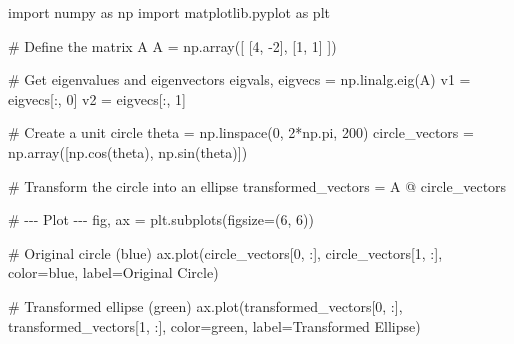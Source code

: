 \documentclass[
  letterpaper,
  DIV=11,
  numbers=noendperiod]{scrreprt}
\newenvironment{Shaded}{\begin{snugshade}}{\end{snugshade}}
\newcommand{\CommentTok}[1]{\textcolor[rgb]{0.37,0.37,0.37}{#1}}
\newcommand{\DecValTok}[1]{\textcolor[rgb]{0.68,0.00,0.00}{#1}}
\newcommand{\ImportTok}[1]{\textcolor[rgb]{0.00,0.46,0.62}{#1}}
\newcommand{\NormalTok}[1]{\textcolor[rgb]{0.00,0.23,0.31}{#1}}
\newcommand{\OperatorTok}[1]{\textcolor[rgb]{0.37,0.37,0.37}{#1}}
\newcommand{\StringTok}[1]{\textcolor[rgb]{0.13,0.47,0.30}{#1}}
\begin{document}
\begin{Shaded}
\begin{Highlighting}[]
\ImportTok{import}\NormalTok{ numpy }\ImportTok{as}\NormalTok{ np}
\ImportTok{import}\NormalTok{ matplotlib.pyplot }\ImportTok{as}\NormalTok{ plt}

\CommentTok{\# Define the matrix A}
\NormalTok{A }\OperatorTok{=}\NormalTok{ np.array([}
\NormalTok{    [}\DecValTok{4}\NormalTok{, }\OperatorTok{{-}}\DecValTok{2}\NormalTok{],}
\NormalTok{    [}\DecValTok{1}\NormalTok{,  }\DecValTok{1}\NormalTok{]}
\NormalTok{])}

\CommentTok{\# Get eigenvalues and eigenvectors}
\NormalTok{eigvals, eigvecs }\OperatorTok{=}\NormalTok{ np.linalg.eig(A)}
\NormalTok{v1 }\OperatorTok{=}\NormalTok{ eigvecs[:, }\DecValTok{0}\NormalTok{]}
\NormalTok{v2 }\OperatorTok{=}\NormalTok{ eigvecs[:, }\DecValTok{1}\NormalTok{]}

\CommentTok{\# Create a unit circle}
\NormalTok{theta }\OperatorTok{=}\NormalTok{ np.linspace(}\DecValTok{0}\NormalTok{, }\DecValTok{2}\OperatorTok{*}\NormalTok{np.pi, }\DecValTok{200}\NormalTok{)}
\NormalTok{circle\_vectors }\OperatorTok{=}\NormalTok{ np.array([np.cos(theta), np.sin(theta)])}

\CommentTok{\# Transform the circle into an ellipse}
\NormalTok{transformed\_vectors }\OperatorTok{=}\NormalTok{ A }\OperatorTok{@}\NormalTok{ circle\_vectors}

\CommentTok{\# {-}{-}{-} Plot {-}{-}{-}}
\NormalTok{fig, ax }\OperatorTok{=}\NormalTok{ plt.subplots(figsize}\OperatorTok{=}\NormalTok{(}\DecValTok{6}\NormalTok{, }\DecValTok{6}\NormalTok{))}

\CommentTok{\# Original circle (blue)}
\NormalTok{ax.plot(circle\_vectors[}\DecValTok{0}\NormalTok{, :], circle\_vectors[}\DecValTok{1}\NormalTok{, :], color}\OperatorTok{=}\StringTok{\textquotesingle{}blue\textquotesingle{}}\NormalTok{, label}\OperatorTok{=}\StringTok{\textquotesingle{}Original Circle\textquotesingle{}}\NormalTok{)}

\CommentTok{\# Transformed ellipse (green)}
\NormalTok{ax.plot(transformed\_vectors[}\DecValTok{0}\NormalTok{, :], transformed\_vectors[}\DecValTok{1}\NormalTok{, :], color}\OperatorTok{=}\StringTok{\textquotesingle{}green\textquotesingle{}}\NormalTok{, label}\OperatorTok{=}\StringTok{\textquotesingle{}Transformed Ellipse\textquotesingle{}}\NormalTok{)}


\end{Highlighting}
\end{Shaded}
\end{document}
